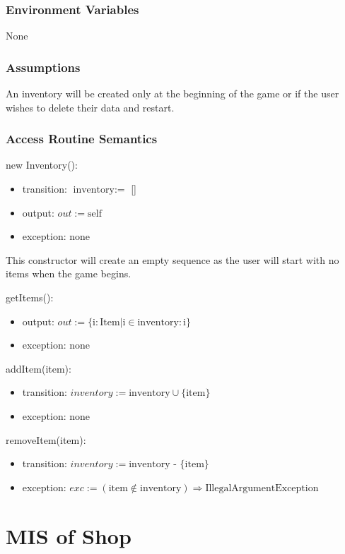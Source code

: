 \documentclass[12pt, titlepage]{article}
\begin{document}
\subsubsection{Environment Variables}
None

\subsubsection{Assumptions}
An inventory will be created only at the beginning of the game or if the user wishes to delete their data and restart.

\subsubsection{Access Routine Semantics}

\noindent new Inventory():
\begin{itemize}
\item transition: $\text{inventory} := $ []
\item output: $out := \mbox{self}$
\item exception: none
\end{itemize}
This constructor will create an empty sequence as the user will start with no items when the game begins.

\noindent getItems():
\begin{itemize}
\item output: $out := \{ \text{i}: \text{Item} | \text{i} \in \text{inventory} : \text{i} \}$
\item exception: none
\end{itemize}

\noindent addItem(item):
\begin{itemize}
\item transition: $inventory := \text{inventory} \cup \{\text{item}\}$ 
\item exception: none
\end{itemize}

\medskip
\noindent removeItem(item):
\begin{itemize}
\item transition: $inventory := \text{inventory} $ - $ \{\text{item}\}$ 
\item exception: $exc :=  (\text{item} \notin \text{inventory}) \Rightarrow \text{IllegalArgumentException}$  
\end{itemize}


\newpage

\section{MIS of Shop} 
\end{document}
